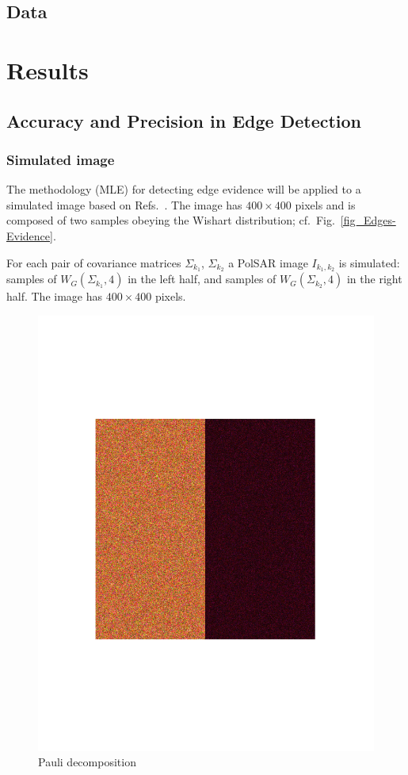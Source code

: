 \documentclass[remotesensing,article,submit,moreauthors,pdftex]{Definitions/mdpi}
\begin{document}
\subsection{Data}
\section{Results}
\subsection{Accuracy and Precision in Edge Detection}
\subsubsection{Simulated image}
The methodology (MLE) for detecting edge evidence will be applied to a simulated image based on Refs.~\cite{nhfc,gamf}. 
The image has $400\times400$ pixels and is composed of two samples obeying the Wishart distribution; cf.\ Fig.~\ref{fig_Edges-Evidence}.

For each pair of covariance matrices $\Sigma_{k_1}$, $\Sigma_{k_2}$ a PolSAR image $I_{k_1,k_2}$ is simulated: 
samples of $W_G(\Sigma_{k_1}, 4)$ in the left half, and 
samples of $W_G(\Sigma_{k_2}, 4)$ in the right half.
The image has $400 \times 400$ pixels.


\begin{figure}[hbt]
	\centering
	\includegraphics[width=.7\linewidth]{phanton_gamf_dec_pauli}%
	\caption{Pauli decomposition}
\label{simulada_gamf_dec_pauli}
\end{figure}
\end{document}
